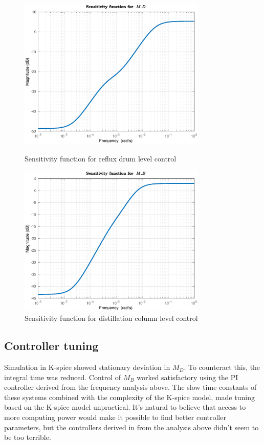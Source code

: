 \documentclass[12pt]{article}
\begin{document}
\begin{figure}[p]
\centering
\includegraphics[width=0.8\textwidth]{../Systemanalyse/Log_Data_to_Matlab/Figurer/DB_tuning/S1.eps}
\caption{Sensitivity function for reflux drum level control}
\label{fig:S1}

\includegraphics[width=0.8\textwidth]{../Systemanalyse/Log_Data_to_Matlab/Figurer/DB_tuning/S2.eps}
\caption{Sensitivity function for distillation column level control}
\label{fig:S2}
\end{figure}

\subsection{Controller tuning}
Simulation in K-spice showed stationary deviation in $M_D$. To counteract this, the integral time was reduced. Control of $M_B$ worked satisfactory using the PI controller derived from the frequency analysis above. The slow time constants of these systems combined with the complexity of the K-spice model, made tuning based on the K-spice model unpractical. It's natural to believe that access to more computing power would make it possible to find better controller parameters, but the controllers derived in from the analysis above didn't seem to be too terrible.
\end{document}
